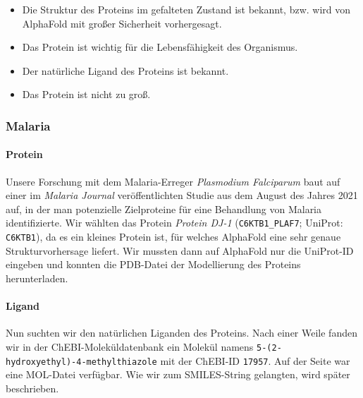 \documentclass[10pt]{article}
\begin{document}
    \begin{itemize}
        \item Die Struktur des Proteins im gefalteten Zustand ist bekannt, bzw. wird von AlphaFold mit großer
        Sicherheit vorhergesagt.
        \item Das Protein ist wichtig für die Lebensfähigkeit des Organismus.
        \item Der natürliche Ligand des Proteins ist bekannt.
        \item Das Protein ist nicht zu groß.
    \end{itemize}


    \subsubsection{Malaria}\label{subsubsec:malaria}

    \paragraph{Protein}

    Unsere Forschung mit dem Malaria-Erreger \emph{Plasmodium Falciparum} baut auf einer im \emph{Malaria Journal}
    veröffentlichten Studie aus dem August des Jahres 2021 auf, in der man potenzielle Zielproteine für eine
    Behandlung von Malaria identifizierte.
    Wir wählten das Protein \emph{Protein DJ-1}
    (\texttt{C6KTB1\_PLAF7};
    UniProt: \texttt{C6KTB1}), da es ein kleines Protein ist, für welches
    AlphaFold eine sehr genaue Strukturvorhersage liefert.\cite{1}
    Wir mussten dann auf AlphaFold nur die UniProt-ID eingeben und konnten die PDB-Datei der Modellierung des
    Proteins herunterladen.

    \paragraph{Ligand}
    Nun suchten wir den natürlichen Liganden des Proteins.
    Nach einer Weile fanden wir in der ChEBI-Moleküldatenbank
    ein Molekül namens \texttt{5-(2-hydroxyethyl)-4-methylthiazole} mit der ChEBI-ID \texttt{17957}.\cite{11}
    Auf der Seite war eine MOL-Datei verfügbar.
    Wie wir zum SMILES-String gelangten, wird später beschrieben.
\end{document}
